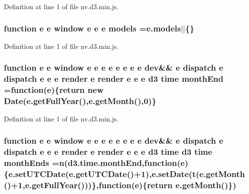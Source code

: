 Definition at line 1 of file nv.\+d3.\+min.\+js.

\subsubsection[{models}]{\setlength{\rightskip}{0pt plus 5cm}function {\bf e} {\bf e} {\bf window} {\bf e} {\bf e} {\bf e} models =e.\+models$\vert$$\vert$\{\}}\label{nv_8d3_8min_8js_a7870919b0ea5bdcc36f09b7a32b599e4}


Definition at line 1 of file nv.\+d3.\+min.\+js.

\subsubsection[{month\+End}]{\setlength{\rightskip}{0pt plus 5cm}function {\bf e} {\bf e} {\bf window} {\bf e} {\bf e} {\bf e} {\bf e} {\bf e} {\bf e} {\bf e} {\bf e} {\bf dev}\&\& {\bf e} {\bf dispatch} {\bf e} {\bf dispatch} {\bf e} {\bf e} {\bf e} {\bf render} {\bf e} {\bf render} {\bf e} {\bf e} {\bf e} {\bf d3} time month\+End =function({\bf e})\{{\bf return} new Date(e.\+get\+Full\+Year(),e.\+get\+Month(),0)\}}\label{nv_8d3_8min_8js_a2baac3f0cfd3ba9bf3fba8fa525eb528}


Definition at line 1 of file nv.\+d3.\+min.\+js.

\subsubsection[{month\+Ends}]{\setlength{\rightskip}{0pt plus 5cm}function {\bf e} {\bf e} {\bf window} {\bf e} {\bf e} {\bf e} {\bf e} {\bf e} {\bf e} {\bf e} {\bf e} {\bf dev}\&\& {\bf e} {\bf dispatch} {\bf e} {\bf dispatch} {\bf e} {\bf e} {\bf e} {\bf render} {\bf e} {\bf render} {\bf e} {\bf e} {\bf e} {\bf d3} time {\bf d3} time month\+Ends ={\bf n}({\bf d3.\+time.\+month\+End},function({\bf e})\{e.\+set\+U\+T\+C\+Date(e.\+get\+U\+T\+C\+Date()+1),e.\+set\+Date(t(e.\+get\+Month()+1,e.\+get\+Full\+Year()))\},function({\bf e})\{{\bf return} e.\+get\+Month()\})}\label{nv_8d3_8min_8js_ab50130679cb4c40b87d98649e6d7833b}


